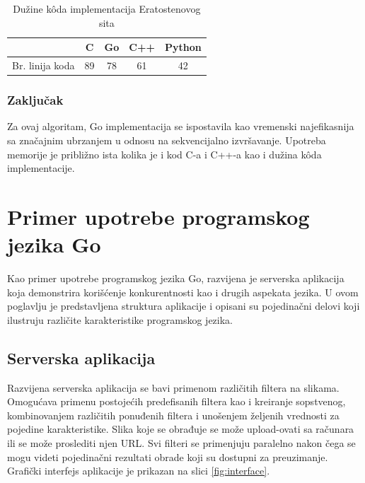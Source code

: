 \documentclass[12pt,oneside]{memoir}
\begin{document}
\begin{table}
\begin{center}
\caption{Dužine k\^{o}da implementacija Eratostenovog sita}
\begin{tabular}{|c|c|c|c|c|}
\hline
		&  C  		&Go 	& C++ & Python 	 \\ \hline
Br. linija koda& 89		& 78	&61	&42		 \\ \hline
\end{tabular}
\label{tab:prime2}
\end{center}
\end{table}

\subsection{Zaključak}

Za ovaj algoritam, Go implementacija se ispostavila kao vremenski najefikasnija sa značajnim ubrzanjem u odnosu na sekvencijalno izvršavanje. Upotreba memorije je približno ista kolika je i kod C-a i C++-a kao i dužina k\^{o}da implementacije.



\chapter{Primer upotrebe programskog jezika Go}

Kao primer upotrebe programskog jezika Go, razvijena je serverska aplikacija koja demonstrira korišćenje konkurentnosti kao i drugih aspekata jezika. U ovom poglavlju je predstavljena struktura aplikacije i opisani su pojedinačni delovi koji ilustruju različite karakteristike programskog jezika. 

\section{Serverska aplikacija}

Razvijena serverska aplikacija se bavi primenom različitih filtera na slikama. Omogućava primenu postojećih predefisanih filtera kao i kreiranje sopstvenog, kombinovanjem različitih ponuđenih filtera i unošenjem željenih vrednosti za pojedine karakteristike. Slika koje se obrađuje se može upload-ovati sa računara ili se može proslediti njen URL. Svi filteri se primenjuju paralelno nakon čega se mogu videti pojedinačni rezultati obrade koji su dostupni za preuzimanje. Grafički interfejs aplikacije je prikazan na slici \ref{fig:interface}.
\end{document}
